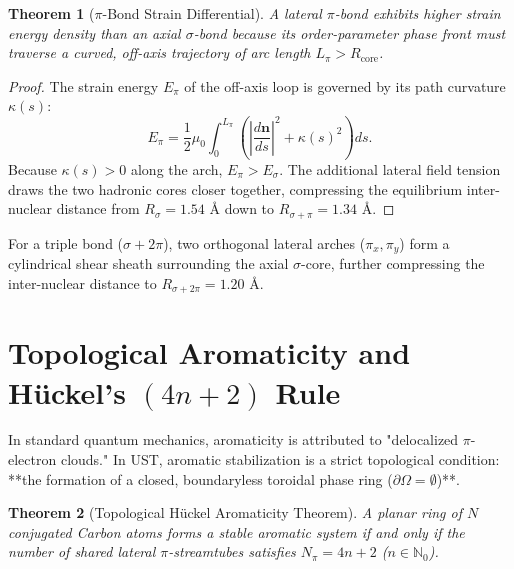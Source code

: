 \documentclass[11pt,a4paper]{article}
\newtheorem{thm}{Theorem}
\begin{document}
	\begin{thm}[\texorpdfstring{$\pi$}{pi}-Bond Strain Differential]
		\label{thm:pi_bond_strain}
		A lateral $\pi$-bond exhibits higher strain energy density than an axial $\sigma$-bond because its order-parameter phase front must traverse a curved, off-axis trajectory of arc length $L_\pi > R_{\text{core}}$.
	\end{thm}
	
	\begin{proof}
		The strain energy $E_\pi$ of the off-axis loop is governed by its path curvature $\kappa(s)$:
		\begin{equation}
			E_\pi = \frac{1}{2}\mu_0 \int_{0}^{L_\pi} \left( \left| \frac{d\mathbf{n}}{ds} \right|^2 + \kappa(s)^2 \right) ds.
			\label{eq:pi_curvature_strain}
		\end{equation}
		Because $\kappa(s) > 0$ along the arch, $E_\pi > E_\sigma$. The additional lateral field tension draws the two hadronic cores closer together, compressing the equilibrium inter-nuclear distance from $R_\sigma = 1.54 \text{ \AA}$ down to $R_{\sigma+\pi} = \mathbf{1.34 \text{ \AA}}$.
	\end{proof}
	
	For a triple bond ($\sigma + 2\pi$), two orthogonal lateral arches ($\pi_x, \pi_y$) form a cylindrical shear sheath surrounding the axial $\sigma$-core, further compressing the inter-nuclear distance to $R_{\sigma+2\pi} = \mathbf{1.20 \text{ \AA}}$.
	
	\section{Topological Aromaticity and Hückel's \texorpdfstring{$(4n+2)$}{(4n+2)} Rule}
	\label{sec:aromaticity_derivation}
	
	In standard quantum mechanics, aromaticity is attributed to "delocalized $\pi$-electron clouds." In UST, aromatic stabilization is a strict topological condition: **the formation of a closed, boundaryless toroidal phase ring ($\partial \Omega = \emptyset$)**.
	
	\begin{thm}[Topological Hückel Aromaticity Theorem]
		\label{thm:hueckel_topological}
		A planar ring of $N$ conjugated Carbon atoms forms a stable aromatic system if and only if the number of shared lateral $\pi$-streamtubes satisfies $N_\pi = 4n + 2$ ($n \in \mathbb{N}_0$).
	\end{thm}
	
\end{document}
